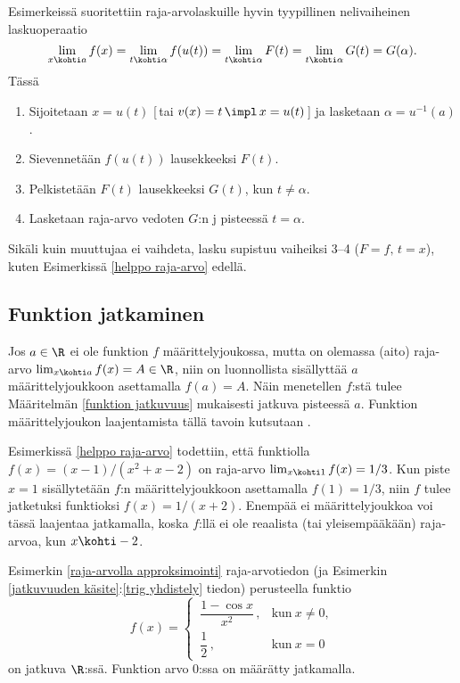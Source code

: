 Esimerkeissä suoritettiin raja-arvolaskuille hyvin tyypillinen nelivaiheinen lasku\-operaatio
\[
\lim_{x \kohti a} f(x) = \lim_{t\kohti\alpha} f(u(t)) = \lim_{t\kohti\alpha} F(t)
                       = \lim_{t\kohti\alpha} G(t) = G(\alpha).
\]
Tässä
\begin{enumerate}
\item Sijoitetaan $x=u(t)$ [\,tai $v(x)=t\,\impl\,x=u(t)$\,] ja lasketaan $\alpha=u^{-1}(a)$.
\item Sievennetään $f(u(t))$ lausekkeeksi $F(t)$.
\item Pelkistetään $F(t)$ lausekkeeksi $G(t)$, kun $t\neq\alpha$.
\item Lasketaan raja-arvo vedoten $G$:n j pisteessä $t=\alpha$.
\end{enumerate}
Sikäli kuin muuttujaa ei vaihdeta, lasku supistuu vaiheiksi 3--4 ($F=f,\,t=x$), kuten
Esimerkissä \ref{helppo raja-arvo} edellä.

\subsection{Funktion jatkaminen}

Jos $a\in\R$ ei ole funktion $f$ määrittelyjoukossa, mutta on olemassa (aito) raja-arvo
$\lim_{x\kohti a} f(x)=A\in\R$, niin on luonnollista sisällyttää $a$ määrittelyjoukkoon
asettamalla $f(a)=A$. Näin menetellen $f$:stä tulee Määritelmän \ref{funktion jatkuvuus}
mukaisesti jatkuva pisteessä $a$. Funktion määrittelyjoukon laajentamista tällä tavoin
kutsutaan .
\begin{Exa} Esimerkissä \ref{helppo raja-arvo} todettiin, että funktiolla
$f(x)=(x-1)/(x^2+x-2)$ on raja-arvo $\lim_{x \kohti 1}f(x)=1/3$. Kun piste $x=1$ sisällytetään
$f$:n määrittelyjoukkoon asettamalla $f(1)=1/3$, niin $f$ tulee jatketuksi funktioksi
$f(x)=1/(x+2)$. Enempää ei määrittelyjoukkoa voi tässä laajentaa jatkamalla, koska
$f$:llä ei ole reaalista (tai yleisempääkään) raja-arvoa, kun $x \kohti -2$. \loppu
\end{Exa}
\begin{Exa} Esimerkin \ref{raja-arvolla approksimointi} raja-arvotiedon
(ja Esimerkin \ref{jatkuvuuden käsite}:\ref{trig yhdistely} tiedon) perusteella funktio
\[ 
f(x) = \begin{cases} \,\dfrac{1-\cos x}{x^2}\,, &\text{kun}\ x \neq 0, \\[2mm]
                     \,\dfrac{1}{2}\,,          &\text{kun}\ x=0
       \end{cases}
\]
on jatkuva $\R$:ssä. Funktion arvo $0$:ssa on määrätty jatkamalla. \loppu
\end{Exa}             

